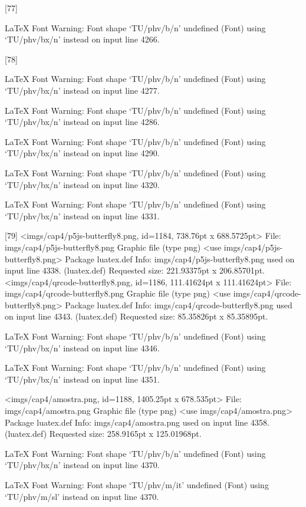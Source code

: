 [77]

LaTeX Font Warning: Font shape `TU/phv/b/n' undefined
(Font)              using `TU/phv/bx/n' instead on input line 4266.

[78]

LaTeX Font Warning: Font shape `TU/phv/b/n' undefined
(Font)              using `TU/phv/bx/n' instead on input line 4277.


LaTeX Font Warning: Font shape `TU/phv/b/n' undefined
(Font)              using `TU/phv/bx/n' instead on input line 4286.


LaTeX Font Warning: Font shape `TU/phv/b/n' undefined
(Font)              using `TU/phv/bx/n' instead on input line 4290.


LaTeX Font Warning: Font shape `TU/phv/b/n' undefined
(Font)              using `TU/phv/bx/n' instead on input line 4320.


LaTeX Font Warning: Font shape `TU/phv/b/n' undefined
(Font)              using `TU/phv/bx/n' instead on input line 4331.

[79]
<imgs/cap4/p5js-butterfly8.png, id=1184, 738.76pt x 688.5725pt>
File: imgs/cap4/p5js-butterfly8.png Graphic file (type png)
<use imgs/cap4/p5js-butterfly8.png>
Package luatex.def Info: imgs/cap4/p5js-butterfly8.png  used on input line 4338.
(luatex.def)             Requested size: 221.93375pt x 206.85701pt.
<imgs/cap4/qrcode-butterfly8.png, id=1186, 111.41624pt x 111.41624pt>
File: imgs/cap4/qrcode-butterfly8.png Graphic file (type png)
<use imgs/cap4/qrcode-butterfly8.png>
Package luatex.def Info: imgs/cap4/qrcode-butterfly8.png  used on input line 4343.
(luatex.def)             Requested size: 85.35826pt x 85.35895pt.

LaTeX Font Warning: Font shape `TU/phv/b/n' undefined
(Font)              using `TU/phv/bx/n' instead on input line 4346.


LaTeX Font Warning: Font shape `TU/phv/b/n' undefined
(Font)              using `TU/phv/bx/n' instead on input line 4351.

<imgs/cap4/amostra.png, id=1188, 1405.25pt x 678.535pt>
File: imgs/cap4/amostra.png Graphic file (type png)
<use imgs/cap4/amostra.png>
Package luatex.def Info: imgs/cap4/amostra.png  used on input line 4358.
(luatex.def)             Requested size: 258.9165pt x 125.01968pt.

LaTeX Font Warning: Font shape `TU/phv/b/n' undefined
(Font)              using `TU/phv/bx/n' instead on input line 4370.


LaTeX Font Warning: Font shape `TU/phv/m/it' undefined
(Font)              using `TU/phv/m/sl' instead on input line 4370.

